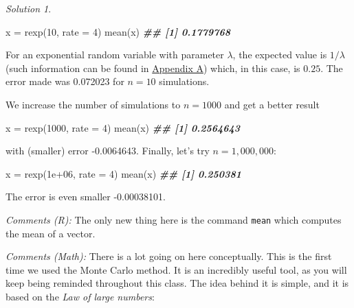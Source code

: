 \documentclass[
]{book}
\newenvironment{Shaded}{\begin{snugshade}}{\end{snugshade}}
\newcommand{\AttributeTok}[1]{\textcolor[rgb]{0.77,0.63,0.00}{#1}}
\newcommand{\DecValTok}[1]{\textcolor[rgb]{0.00,0.00,0.81}{#1}}
\newcommand{\DocumentationTok}[1]{\textcolor[rgb]{0.56,0.35,0.01}{\textbf{\textit{#1}}}}
\newcommand{\FloatTok}[1]{\textcolor[rgb]{0.00,0.00,0.81}{#1}}
\newcommand{\FunctionTok}[1]{\textcolor[rgb]{0.00,0.00,0.00}{#1}}
\newcommand{\NormalTok}[1]{#1}
\newcommand{\OtherTok}[1]{\textcolor[rgb]{0.56,0.35,0.01}{#1}}
\theoremstyle{definition}
\theoremstyle{definition}
\theoremstyle{definition}
\theoremstyle{definition}
\theoremstyle{remark}
\newtheorem*{solution}{Solution}
\begin{document}
\begin{solution}
~

\begin{Shaded}
\begin{Highlighting}[]
\NormalTok{x }\OtherTok{=} \FunctionTok{rexp}\NormalTok{(}\DecValTok{10}\NormalTok{, }\AttributeTok{rate =} \DecValTok{4}\NormalTok{)}
\FunctionTok{mean}\NormalTok{(x)}
\DocumentationTok{\#\# [1] 0.1779768}
\end{Highlighting}
\end{Shaded}

For an exponential random variable with parameter \(\lambda\), the expected value is
\(1/\lambda\) (such information can be found in \href{./dist.html}{Appendix A}) which,
in this case, is \(0.25\). The error made was 0.072023 for \(n=10\) simulations.

We increase the number of simulations to \(n=1000\) and get a better result

\begin{Shaded}
\begin{Highlighting}[]
\NormalTok{x }\OtherTok{=} \FunctionTok{rexp}\NormalTok{(}\DecValTok{1000}\NormalTok{, }\AttributeTok{rate =} \DecValTok{4}\NormalTok{)}
\FunctionTok{mean}\NormalTok{(x)}
\DocumentationTok{\#\# [1] 0.2564643}
\end{Highlighting}
\end{Shaded}

with (smaller) error -0.0064643. Finally, let's try \(n=1,000,000\):

\begin{Shaded}
\begin{Highlighting}[]
\NormalTok{x }\OtherTok{=} \FunctionTok{rexp}\NormalTok{(}\FloatTok{1e+06}\NormalTok{, }\AttributeTok{rate =} \DecValTok{4}\NormalTok{)}
\FunctionTok{mean}\NormalTok{(x)}
\DocumentationTok{\#\# [1] 0.250381}
\end{Highlighting}
\end{Shaded}

The error is even smaller -0.00038101.

\emph{Comments (R):} The only new thing here is the command \texttt{mean} which computes the mean of a vector.

\emph{Comments (Math):} There is a lot going on here conceptually. This is the first time we
used the Monte Carlo method. It is an incredibly useful tool, as you will keep
being reminded throughout this class. The idea behind it is simple, and it is
based on the \emph{Law of large numbers}:


\end{solution}
\end{document}
